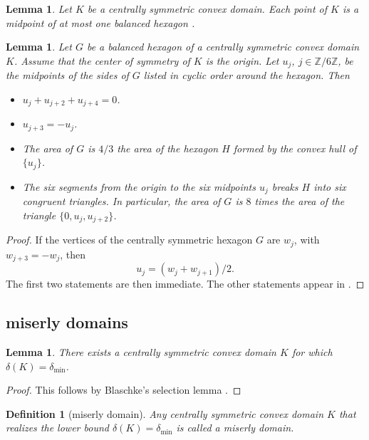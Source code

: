 \documentclass[11pt]{amsart}
\newtheorem{definition}[equation]{Definition}
\newtheorem{lemma}[equation]{Lemma}
\newcommand{\ring}[1]{\mathbb{#1}}
\def\deltalat{\mathbb\delta}  %
\def\delt{\delta_{\min}}
\begin{document}
\begin{lemma}\label{lemma:mid1} 
  Let $K$ be a centrally symmetric convex domain.  Each point of $K$
  is a midpoint of at most one balanced hexagon \cite[p.228]{Reinhardt:1934}.
\end{lemma}



\begin{lemma}\label{lemma:8G} 
  Let $G$ be a balanced hexagon of a centrally symmetric convex domain
  $K$.  Assume that the center of symmetry of $K$ is the origin.  Let
  $u_j$, $j\in \ring{Z}/6\ring{Z}$, be the midpoints of the sides of
  $G$ listed in cyclic order around the hexagon.  Then
 \begin{itemize}
 \item $u_j+u_{j+2}+u_{j+4}=0$.
 \item $u_{j+3} = -u_j$.
 \item The area of $G$ is $4/3$ the area of the hexagon 
     $H$ formed by the convex hull of $\{u_j\}$.
  \item The six segments from the origin to the six midpoints $u_j$ breaks
    $H$ into six congruent triangles.  In particular, the area of $G$
    is $8$ times the area of the triangle $\{0,u_j,u_{j+2}\}$.
  \end{itemize}
\end{lemma}

\begin{proof} If the vertices of the centrally symmetric hexagon $G$
  are $w_j$, with $w_{j+3} = - w_j$, then
\[
u_j = (w_j+w_{j+1})/2.
\]
The first two statements are then immediate.  The other statements appear in 
\cite[p.219,p.222]{Reinhardt:1934}.
\end{proof}


\subsection{miserly domains}

\begin{lemma}  There exists a centrally symmetric convex domain
$K$ for which $\deltalat(K) = \delt$.
\end{lemma}

\begin{proof} This follows by Blaschke's selection lemma \cite[p.220]{Reinhardt:1934}.
\end{proof}
%
\begin{definition}[miserly domain]
  Any centrally symmetric convex domain $K$ that realizes the lower
  bound $\deltalat(K) = \delt$ is called a {\it miserly
    domain}. %
\end{definition}
\end{document}
